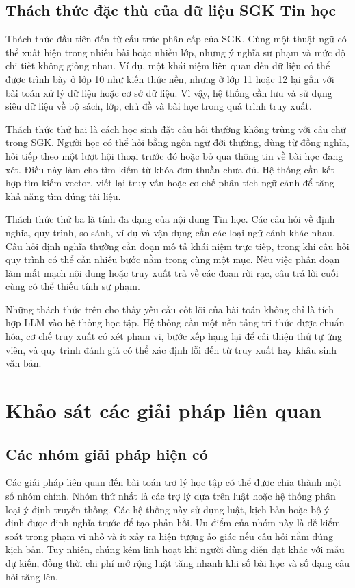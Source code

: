 \documentclass[../DoAn.tex]{subfiles}
\begin{document}
\subsection{Thách thức đặc thù của dữ liệu SGK Tin học}

Thách thức đầu tiên đến từ cấu trúc phân cấp của SGK. Cùng một thuật ngữ có thể xuất hiện trong nhiều bài hoặc nhiều lớp, nhưng ý nghĩa sư phạm và mức độ chi tiết không giống nhau. Ví dụ, một khái niệm liên quan đến dữ liệu có thể được trình bày ở lớp 10 như kiến thức nền, nhưng ở lớp 11 hoặc 12 lại gắn với bài toán xử lý dữ liệu hoặc cơ sở dữ liệu. Vì vậy, hệ thống cần lưu và sử dụng siêu dữ liệu về bộ sách, lớp, chủ đề và bài học trong quá trình truy xuất.

Thách thức thứ hai là cách học sinh đặt câu hỏi thường không trùng với câu chữ trong SGK. Người học có thể hỏi bằng ngôn ngữ đời thường, dùng từ đồng nghĩa, hỏi tiếp theo một lượt hội thoại trước đó hoặc bỏ qua thông tin về bài học đang xét. Điều này làm cho tìm kiếm từ khóa đơn thuần chưa đủ. Hệ thống cần kết hợp tìm kiếm vector, viết lại truy vấn hoặc cơ chế phân tích ngữ cảnh để tăng khả năng tìm đúng tài liệu.

Thách thức thứ ba là tính đa dạng của nội dung Tin học. Các câu hỏi về định nghĩa, quy trình, so sánh, ví dụ và vận dụng cần các loại ngữ cảnh khác nhau. Câu hỏi định nghĩa thường cần đoạn mô tả khái niệm trực tiếp, trong khi câu hỏi quy trình có thể cần nhiều bước nằm trong cùng một mục. Nếu việc phân đoạn làm mất mạch nội dung hoặc truy xuất trả về các đoạn rời rạc, câu trả lời cuối cùng có thể thiếu tính sư phạm.

Những thách thức trên cho thấy yêu cầu cốt lõi của bài toán không chỉ là tích hợp LLM vào hệ thống học tập. Hệ thống cần một nền tảng tri thức được chuẩn hóa, cơ chế truy xuất có xét phạm vi, bước xếp hạng lại để cải thiện thứ tự ứng viên, và quy trình đánh giá có thể xác định lỗi đến từ truy xuất hay khâu sinh văn bản.

\section{Khảo sát các giải pháp liên quan}

\subsection{Các nhóm giải pháp hiện có}

Các giải pháp liên quan đến bài toán trợ lý học tập có thể được chia thành một số nhóm chính. Nhóm thứ nhất là các trợ lý dựa trên luật hoặc hệ thống phân loại ý định truyền thống. Các hệ thống này sử dụng luật, kịch bản hoặc bộ ý định được định nghĩa trước để tạo phản hồi. Ưu điểm của nhóm này là dễ kiểm soát trong phạm vi nhỏ và ít xảy ra hiện tượng ảo giác nếu câu hỏi nằm đúng kịch bản. Tuy nhiên, chúng kém linh hoạt khi người dùng diễn đạt khác với mẫu dự kiến, đồng thời chi phí mở rộng luật tăng nhanh khi số bài học và số dạng câu hỏi tăng lên.
\end{document}
